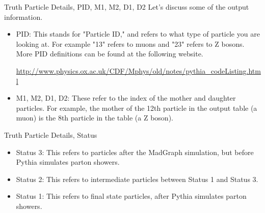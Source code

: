 \documentclass{beamer}
\begin{document}
	\begin{frame}{Truth Particle Details, PID, M1, M2, D1, D2}
Let's discuss some of the output information.

\bigskip

		\begin{itemize}
\item<1->PID: This stands for "Particle ID," and refers to what type of particle you are looking at. For example "13" refers to muons and "23" refers to Z bosons. More PID definitions can be found at the following website.

\bigskip

\url{http://www.physics.ox.ac.uk/CDF/Mphys/old/notes/pythia_codeListing.html}

\bigskip

\item<1->M1, M2, D1, D2: These refer to the index of the mother and daughter particles. For example, the mother of the 12th particle in the output table (a muon) is the 8th particle in the table (a Z boson).
		\end{itemize}

\bigskip
	\end{frame}
	\begin{frame}{Truth Particle Details, Status}

		\begin{itemize}
\item<1->Status 3: This refers to particles after the MadGraph simulation, but before Pythia simulates parton showers.
\item<1->Status 2: This refers to intermediate particles between Status 1 and Status 3.
\item<1->Status 1: This refers to final state particles, after Pythia simulates parton showers.
		\end{itemize}

\bigskip
	\end{frame}
\end{document}
